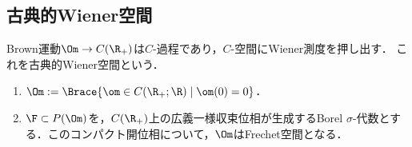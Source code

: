 \documentclass[uplatex,dvipdfmx]{jsreport}
\begin{document}
\subsection{古典的Wiener空間}

\begin{tcolorbox}[colframe=ForestGreen, colback=ForestGreen!10!white,breakable,colbacktitle=ForestGreen!40!white,coltitle=black,fonttitle=\bfseries\sffamily,
title=]
    Brown運動$\Om\to C(\R_+)$は$C$-過程であり，$C$-空間にWiener測度を押し出す．
    これを古典的Wiener空間という．
\end{tcolorbox}

\begin{definition}\mbox{}
    \begin{enumerate}
        \item $\Om:=\Brace{\om\in C(\R_+;\R)\mid\om(0)=0}$．
        \item $\F\subset P(\Om)$を，$C(\R_+)$上の広義一様収束位相が生成するBorel $\sigma$-代数とする．このコンパクト開位相について，$\Om$はFrechet空間となる．
    \end{enumerate}
\end{definition}
\end{document}
